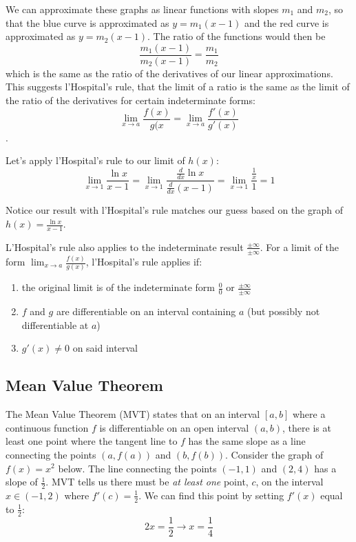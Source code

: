 We can approximate these graphs as linear functions with slopes $m_1$ and $m_2$, so that the blue curve is approximated as $y=m_1(x-1)$ and the red curve is approximated as $y=m_2(x-1)$. The ratio of the functions would then be $$\frac{m_1(x-1)}{m_2(x-1)}=\frac{m_1}{m_2}$$ which is the same as the ratio of the derivatives of our linear approximations. This suggests l'Hospital's rule, that the limit of a ratio is the same as the limit of the ratio of the derivatives for certain indeterminate forms: $$\lim_{x\to a}\frac{f(x)}{g(x}=\lim_{x\to a}\frac{f'(x)}{g'(x)}$$.

Let's apply l'Hospital's rule to our limit of $h(x)$:
$$\lim_{x\to 1}\frac{\ln{x}}{x-1}=\lim_{x \to 1}\frac{\frac{d}{dx}\ln{x}}{\frac{d}{dx}(x-1)}=\lim_{x \to 1}\frac{\frac{1}{x}}{1}=1$$

Notice our result with l'Hospital's rule matches our guess based on the graph of $h(x) = \frac{\ln{x}}{x-1}$. 

L'Hospital's rule also applies to the indeterminate result $\frac{\pm \infty}{\pm \infty}$. For a limit of the form $\lim_{x\to a}\frac{f(x)}{g(x)}$, l'Hospital's rule applies if:
\begin{enumerate}
    \item the original limit is of the indeterminate form $\frac{0}{0}$ or $\frac{\pm \infty}{\pm \infty}$
    \item $f$ and $g$ are differentiable on an interval containing $a$ (but possibly not differentiable at $a$)
    \item $g'(x) \neq 0$ on said interval
\end{enumerate}



\subsection{Mean Value Theorem}

The Mean Value Theorem (MVT) states that on an interval $[a, b]$ where a continuous function $f$ is differentiable on an open interval $(a, b)$, there is at least one point where the tangent line to $f$ has the same slope as a line connecting the points $(a, f(a))$ and $(b, f(b))$. Consider the graph of $f(x) = x^2$ below. The line connecting the points $(-1, 1)$ and $(2, 4)$ has a slope of $\frac{1}{2}$. MVT tells us there must be \textit{at least one} point, $c$, on the interval $x \in (-1, 2)$ where $f'(c) = \frac{1}{2}$. We can find this point by setting $f'(x)$ equal to $\frac{1}{2}$: $$2x=\frac{1}{2} \rightarrow x=\frac{1}{4}$$

